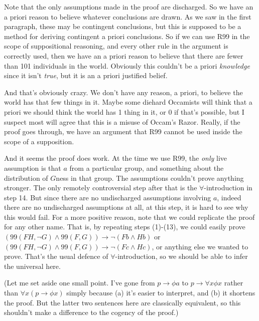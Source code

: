 Note that the only assumptions made in the proof are discharged. So we have an a priori reason to believe whatever conclusions are drawn. As we saw in the first paragraph, these may be contingent conclusions, but this is supposed to be a method for deriving contingent a priori conclusions. So if we can use R99 in the scope of suppositional reasoning, and every other rule in the argument is correctly used, then we have an a priori reason to believe that there are fewer than 101 individuals in the world. Obviously this couldn't be a priori \textit{knowledge} since it isn't \textit{true}, but it is an a priori justified belief. 

And that's obviously crazy. We don't have any reason, a priori, to believe the world has that few things in it. Maybe some diehard Occamists will think that a priori we should think the world has 1 thing in it, or 0 if that's possible, but I suspect most will agree that this is a misuse of Occam's Razor. Really, if the proof goes through, we have an argument that R99 cannot be used inside the scope of a supposition.

And it seems the proof does work. At the time we use R99, the \textit{only} live assumption is that $a$ from a particular group, and something about the distribution of $G$ness in that group. The assumptions couldn't prove anything stronger. The only remotely controversial step after that is the $\forall$-introduction in step 14. But since there are no undischarged assumptions involving $a$, indeed there are no undischarged assumptions at all, at this step, it is hard to see why this would fail. For a more positive reason, note that we could replicate the proof for any other name. That is, by repeating steps (1)-(13), we could easily prove $(99(FH, \neg G) \wedge 99(F, G)) \rightarrow \neg(Fb \wedge Hb)$ or $(99(FH, \neg G) \wedge 99(F, G)) \rightarrow \neg(Fc \wedge Hc)$, or anything else we wanted to prove. That's the usual defence of $\forall$-introduction, so we should be able to infer the universal here.

(Let me set aside one small point. I've gone from $p \rightarrow \phi a$ to $p \rightarrow \forall x \phi x$ rather than $\forall x (p \rightarrow \phi x)$ simply because (a) it's easier to interpret, and (b) it shortens the proof. But the latter two sentences here are classically equivalent, so this shouldn't make a difference to the cogency of the proof.)

